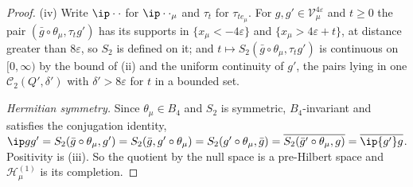 \begin{proof}
(iv) Write $\ip\cdot\cdot$ for $\ip\cdot\cdot_\mu$ and $\tau_t$ for
$\tau_{te_\mu}$. For $g,g'\in\mathcal V^{4\varepsilon}_\mu$ and $t\ge0$ the
pair $(\bar g\circ\theta_\mu,\tau_tg')$ has its supports in $\{x_\mu<-4
\varepsilon\}$ and $\{x_\mu>4\varepsilon+t\}$, at distance greater than
$8\varepsilon$, so $S_2$ is defined on it; and $t\mapsto S_2(\bar g\circ
\theta_\mu,\tau_tg')$ is continuous on $[0,\infty)$ by the bound of (ii)
and the uniform continuity of $g'$, the pairs lying in one $\mathcal C_2(Q',
\delta')$ with $\delta'>8\varepsilon$ for $t$ in a bounded set.

\emph{Hermitian symmetry.} Since $\theta_\mu\in B_4$ and $S_2$ is symmetric,
$B_4$-invariant and satisfies the conjugation identity,
$\ip g{g'}=S_2(\bar g\circ\theta_\mu,g')=S_2(\bar g,g'\circ\theta_\mu)=
S_2(g'\circ\theta_\mu,\bar g)=\overline{S_2(\bar g'\circ\theta_\mu,g)}=
\overline{\ip{g'}g}$. Positivity is (iii). So the quotient by the null
space is a pre-Hilbert space and $\mathcal H^{(1)}_\mu$ is its completion.


\end{proof}
